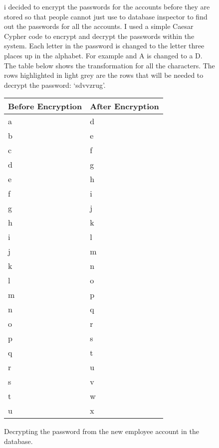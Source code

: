 \begin{figure}[H]
    \caption{Decrypting the password from the new employee account in the database.} \label{fig:test-307-4}

\vspace{5mm}
  i decided to encrypt the passwords for the accounts before they are stored so that people cannot just use to database inspector to find out the passwords for all the accounts. I used a simple Caesar Cypher code to encrypt and decrypt the passwords within the system. Each letter in the password is changed to the letter three places up in the alphabet. For example and A is changed to a D. The table below shows the transformation for all the characters. The rows highlighted in light grey are the rows that will be needed to decrypt the password: `sdvvzrug'.

\vspace{5mm}
\begin{center}
\begin{tabular}{|p{3.5cm}|p{3.5cm}|}
        \hline
        \textbf{Before Encryption} & \textbf{After Encryption} \\ \hline
       \rowcolor{light-grey} a & d \\ \hline
        b & e\\ \hline
        c & f\\ \hline
       \rowcolor{light-grey} d & g\\ \hline
        e & h\\ \hline
        f & i\\ \hline
        g & j\\ \hline
        h & k\\ \hline
        i & l\\ \hline
        j & m\\ \hline
        k & n\\ \hline
        l & o\\ \hline
        m & p\\ \hline
        n & q\\ \hline
       \rowcolor{light-grey} o & r\\ \hline
       \rowcolor{light-grey}p & s\\ \hline
       q & t\\ \hline
      \rowcolor{light-grey}  r & u\\ \hline
      \rowcolor{light-grey}  s & v\\ \hline
        t & w\\ \hline
        u & x\\ \hline

\end{tabular}
\end{center}
\end{figure}
